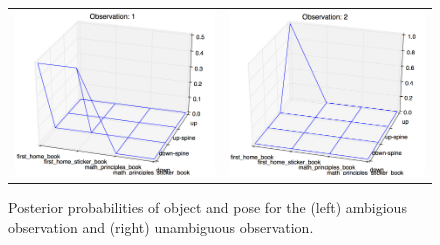         \begin{figure}[h]
            \centering
            \begin{tabular}{cc} 
                \includegraphics[scale=0.4]{pics/experimentObs1.png}
                    &
                \includegraphics[scale=0.4]{pics/experimentObs2.png}
            \end{tabular}
            \caption{Posterior probabilities of object and pose for the (left) ambigious observation and (right) unambiguous observation.}
            \label{fig:expObsPost}
        \end{figure}

